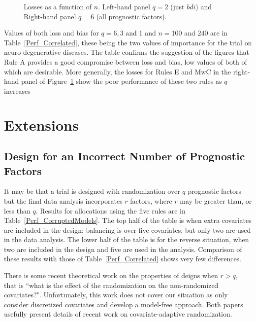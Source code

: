 \documentclass[number,12pt,review]{elsarticle}
\begin{document}
\begin{figure}[ht]
\centering
 \hspace*{4mm}%
 \caption{Losses as a function of $n$. Left-hand panel $q=2$ (just $bdi$) and Right-hand panel $q = 6$ (all prognostic factors).}
 \label{1or5Covarplus1}
\end{figure}

Values of both loss and bias for $q = 6, 3$ and 1 and $n = 100$ and $240$ are in Table~\ref{Perf_Correlated}, these being the two values of importance for the trial on neuro-degenerative diseases. The table confirms the suggestion of the figures that Rule A provides a good compromise between loss and bias, low values of both of which are desirable. More generally, the losses for Rules E and MwC in the right-hand panel of Figure~\ref{1or5Covarplus1} show the poor performance of these two rules as $q$ increases

\section{Extensions}

\label{extsec}

\subsection{Design for an Incorrect Number of Prognostic Factors}

\label{incorectsec}

It may be that a trial is designed with randomization over $q$ prognostic factors but the final data analysis incorporates $r$ factors, where $r$ may be greater than, or less than $q$. Results for allocations using the five rules are in Table~\ref{Perf_CorruptedModels}. The top half of the table is when extra covariates are included in the design: balancing is over five covariates, but only two are used in the data analysis. The lower half of the table is for the reverse situation, when two are included in the design and five are used in the analysis. Comparison of these results with those of Table~\ref{Perf_Correlated} shows very few differences.

There is some recent theoretical work on the properties of deigns when $r > q$, that is ``what is the effect of the randomization on the non-randomized covariates?". Unfortunately, this work does not cover our situation as \citet{liu2020balancing} only consider discretized covariates and \citet{YeYiShaoBka2022} develop a model-free approach. Both papers usefully present details of recent work on covariate-adaptive randomization.
\end{document}
